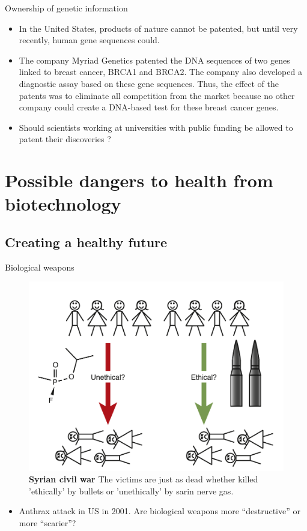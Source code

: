 \documentclass[ignorenonframetext,aspectratio=169]{beamer}
\providecommand{\tightlist}{%
  \setlength{\itemsep}{0pt}\setlength{\parskip}{0pt}}
\begin{document}
\begin{frame}{Ownership of genetic information}
\protect\hypertarget{ownership-of-genetic-information}{}

\begin{itemize}
\tightlist
\item
  In the United States, products of nature cannot be patented, but until
  very recently, human gene sequences could.
\item
  The company Myriad Genetics patented the DNA sequences of two genes
  linked to breast cancer, BRCA1 and BRCA2. The company also developed a
  diagnostic assay based on these gene sequences. Thus, the effect of
  the patents was to eliminate all competition from the market because
  no other company could create a DNA-based test for these breast cancer
  genes.
\item
  Should scientists working at universities with public funding be
  allowed to patent their discoveries ?
\end{itemize}

\end{frame}

\hypertarget{possible-dangers-to-health-from-biotechnology}{%
\section{Possible dangers to health from
biotechnology}\label{possible-dangers-to-health-from-biotechnology}}

\hypertarget{creating-a-healthy-future}{%
\subsection{Creating a healthy future}\label{creating-a-healthy-future}}

\begin{frame}{Biological weapons}
\protect\hypertarget{biological-weapons}{}

\begin{figure}
\includegraphics[width=0.28\linewidth]{../images/biological_weapon} \caption{\textbf{Syrian civil war} The victims are just as dead whether killed 'ethically' by bullets or 'unethically' by sarin nerve gas.}\label{fig:biofuel-production}
\end{figure}

\begin{itemize}
\tightlist
\item
  Anthrax attack in US in 2001. Are biological weapons more
  ``destructive'' or more ``scarier''?
\end{itemize}

\end{frame}
\end{document}
